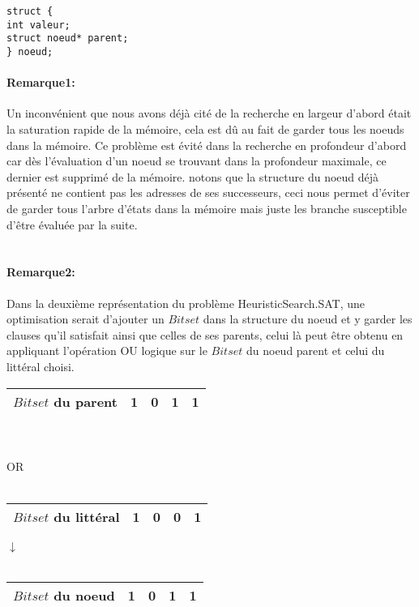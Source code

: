 \begin{lstlisting}
struct {
int valeur; 
struct noeud* parent;
} noeud;
\end{lstlisting}

\paragraph{Remarque1:}\label{BreadthIssue} Un inconvénient que nous avons déjà cité de la recherche en largeur d’abord était la saturation rapide de la mémoire, cela est dû au fait de garder tous les noeuds dans la mémoire. Ce problème est évité dans la recherche en profondeur d’abord car dès l’évaluation d’un noeud se trouvant dans la profondeur maximale, ce dernier est supprimé de la mémoire. notons que la structure du noeud déjà présenté ne contient pas les adresses de ses successeurs, ceci nous permet d’éviter de garder tous l’arbre d’états dans la mémoire mais juste les branche susceptible d’être évaluée par la suite.\\~\\
\paragraph{Remarque2:} Dans la deuxième représentation du problème HeuristicSearch.SAT, une optimisation serait d’ajouter un $Bitset$ dans la structure du noeud et y garder les clauses qu’il satisfait ainsi que celles de ses parents, celui là peut être obtenu en appliquant l’opération OU logique sur le $Bitset$ du noeud parent et celui du littéral choisi.\\
\begin{center}
	\begin{minipage}{0.5\textwidth}
		\centering
		\begin{tabular}{|c | c| c| c|c|}
			\hline
			$Bitset$ du parent& 1 & 0 & 1 & 1 \\\hline
		\end{tabular}
	\end{minipage}
	\\~\\
	OR
	\\~\\
	\begin{minipage}{0.5\textwidth}
		\centering
		\begin{tabular}{|c | c| c| c|c|}
			\hline
			$Bitset$ du littéral& 1 & 0 & 0 & 1\\\hline
		\end{tabular}
	\end{minipage}
	\begin{center}

		$\downarrow$
		\\~\\
		\begin{tabular}{|c | c| c| c|c|}
			\hline
			$Bitset$ du noeud& 1 & 0 & 1 & 1\\\hline
		\end{tabular}
	\end{center}
\end{center}


